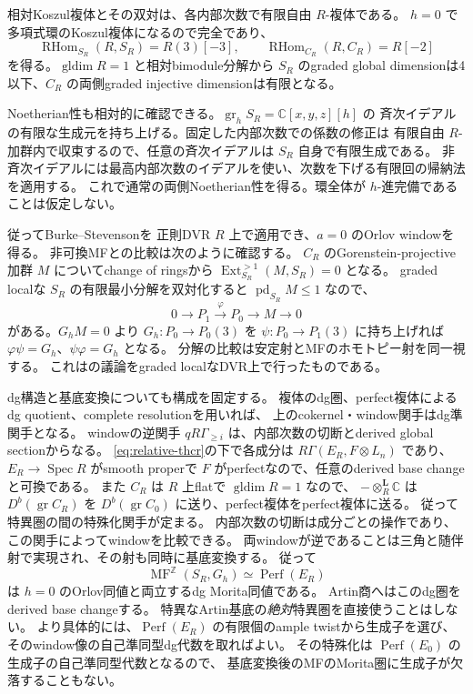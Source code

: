 \documentclass[a4paper,11pt]{ltjsarticle}
\theoremstyle{definition}
\newcommand{\CC}{\mathbb C}
\newcommand{\Ext}{\operatorname{Ext}}
\newcommand{\Perf}{\operatorname{Perf}}
\newcommand{\RHom}{\operatorname{RHom}}
\newcommand{\MF}{\operatorname{MF}}
\begin{document}
相対Koszul複体とその双対は、各内部次数で有限自由 $R$-複体である。
$h=0$ で多項式環のKoszul複体になるので完全であり、
\[
 \RHom_{S_R}(R,S_R)=R(3)[-3],\qquad
 \RHom_{C_R}(R,C_R)=R[-2]
\]
を得る。$\operatorname{gldim}R=1$ と相対bimodule分解から
$S_R$ のgraded global dimensionは4以下、$C_R$ の両側graded injective dimensionは有限となる。

Noetherian性も相対的に確認できる。$\operatorname{gr}_hS_R=\CC[x,y,z][h]$ の
斉次イデアルの有限な生成元を持ち上げる。固定した内部次数での係数の修正は
有限自由 $R$-加群内で収束するので、任意の斉次イデアルは $S_R$ 自身で有限生成である。
非斉次イデアルには最高内部次数のイデアルを使い、次数を下げる有限回の帰納法を適用する。
これで通常の両側Noetherian性を得る。環全体が $h$-進完備であることは仮定しない。

従ってBurke--Stevenson\cite[Definition 5.1, Lemma 6.2, Theorem 6.4(3)]{BS}を
正則DVR $R$ 上で適用でき、$a=0$ のOrlov windowを得る。
非可換MFとの比較は次のように確認する。
$C_R$ のGorenstein-projective加群 $M$ についてchange of ringsから
$\Ext^{>1}_{S_R}(M,S_R)=0$ となる。
graded localな $S_R$ の有限最小分解を双対化すると
$\operatorname{pd}_{S_R}M\le1$ なので、
\[
 0\to P_1\xrightarrow\varphi P_0\to M\to0
\]
がある。$G_hM=0$ より $G_h:P_0\to P_0(3)$ を $\psi:P_0\to P_1(3)$ に持ち上げれば
$\varphi\psi=G_h$、$\psi\varphi=G_h$ となる。
分解の比較は安定射とMFのホモトピー射を同一視する。
これは\cite{CCKM}の議論をgraded localなDVR上で行ったものである。

dg構造と基底変換についても構成を固定する。
複体のdg圏、perfect複体によるdg quotient、complete resolutionを用いれば、
上のcokernel・window関手はdg準関手となる。
windowの逆関手 $qR\Gamma_{\ge i}$ は、内部次数の切断とderived global sectionからなる。
\eqref{eq:relative-thcr}の下で各成分は
$R\Gamma(E_R,F\otimes L_n)$ であり、$E_R\to\operatorname{Spec}R$ がsmooth properで
$F$ がperfectなので、任意のderived base changeと可換である。
また $C_R$ は $R$ 上flatで $\operatorname{gldim}R=1$ なので、
$-\otimes_R^{\mathbf L}\mathbb C$ は $D^b(\operatorname{gr}C_R)$ を
$D^b(\operatorname{gr}C_0)$ に送り、perfect複体をperfect複体に送る。
従って特異圏の間の特殊化関手が定まる。
内部次数の切断は成分ごとの操作であり、この関手によってwindowを比較できる。
両windowが逆であることは三角と随伴射で実現され、その射も同時に基底変換する。
従って
\[
 \MF^{\mathbb Z}(S_R,G_h)\simeq\Perf(E_R)
\]
は $h=0$ のOrlov同値と両立するdg Morita同値である。
Artin商へはこのdg圏をderived base changeする。
特異なArtin基底の\emph{絶対}特異圏を直接使うことはしない。
より具体的には、$\Perf(E_R)$ の有限個のample twistから生成子を選び、
そのwindow像の自己準同型dg代数を取ればよい。
その特殊化は $\Perf(E_0)$ の生成子の自己準同型代数となるので、
基底変換後のMFのMorita圏に生成子が欠落することもない。
\end{document}
